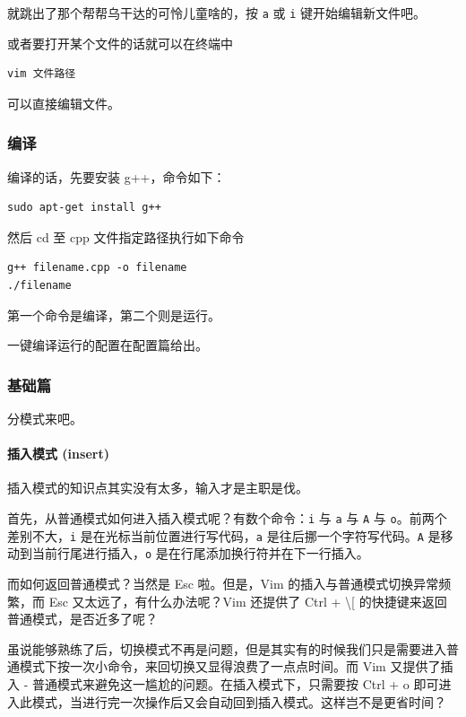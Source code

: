 就跳出了那个帮帮乌干达的可怜儿童啥的，按 \texttt{a} 或 \texttt{i} 键开始编辑新文件吧。

或者要打开某个文件的话就可以在终端中

\begin{verbatim}
vim 文件路径
\end{verbatim}

可以直接编辑文件。

\subsubsection{编译}

编译的话，先要安装 g++，命令如下：

\begin{verbatim}
sudo apt-get install g++
\end{verbatim}

然后 cd 至 cpp 文件指定路径执行如下命令

\begin{verbatim}
g++ filename.cpp -o filename
./filename
\end{verbatim}

第一个命令是编译，第二个则是运行。

一键编译运行的配置在配置篇给出。

\subsubsection{基础篇}

分模式来吧。

\paragraph{插入模式 (insert)}

插入模式的知识点其实没有太多，输入才是主职是伐。

首先，从普通模式如何进入插入模式呢？有数个命令：\texttt{i} 与 \texttt{a} 与 \texttt{A} 与 \texttt{o}。前两个差别不大，\texttt{i} 是在光标当前位置进行写代码，\texttt{a} 是往后挪一个字符写代码。\texttt{A} 是移动到当前行尾进行插入，\texttt{o} 是在行尾添加换行符并在下一行插入。

而如何返回普通模式？当然是 Esc 啦。但是，Vim 的插入与普通模式切换异常频繁，而 Esc 又太远了，有什么办法呢？Vim 还提供了 Ctrl + \textbackslash{}[ 的快捷键来返回普通模式，是否近多了呢？

虽说能够熟练了后，切换模式不再是问题，但是其实有的时候我们只是需要进入普通模式下按一次小命令，来回切换又显得浪费了一点点时间。而 Vim 又提供了插入 - 普通模式来避免这一尴尬的问题。在插入模式下，只需要按 Ctrl + o 即可进入此模式，当进行完一次操作后又会自动回到插入模式。这样岂不是更省时间？

